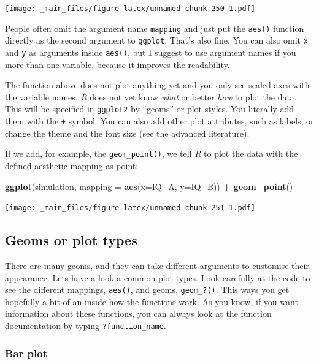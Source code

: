 \documentclass[
]{scrartcl}
\newenvironment{Shaded}{\begin{snugshade}}{\end{snugshade}}
\newcommand{\AttributeTok}[1]{\textcolor[rgb]{0.13,0.29,0.53}{#1}}
\newcommand{\FunctionTok}[1]{\textcolor[rgb]{0.13,0.29,0.53}{\textbf{#1}}}
\newcommand{\NormalTok}[1]{#1}
\newcommand{\SpecialCharTok}[1]{\textcolor[rgb]{0.81,0.36,0.00}{\textbf{#1}}}
\begin{document}
\texttt{[image: \_main\_files/figure-latex/unnamed-chunk-250-1.pdf]}

People often omit the argument name \texttt{mapping} and just put the \texttt{aes()} function directly as the second argument to \texttt{ggplot}. That's also fine. You can also omit \texttt{x} and \texttt{y} as arguments inside \texttt{aes()}, but I suggest to use argument names if you more than one variable, because it improves the readability.

The function above does not plot anything yet and you only see scaled axes with the variable names. \emph{R} does not yet know \emph{what} or better \emph{how} to plot the data. This will be specified in \texttt{ggplot2} by ``geoms'' or plot styles. You literally add them with the \texttt{+} symbol. You can also add other plot attributes, such as labels, or change the theme and the font size (see the advanced literature).

If we add, for example, the \texttt{geom\_point()}, we tell \emph{R} to plot the data with the defined aesthetic mapping as point:

\begin{Shaded}
\begin{Highlighting}[]
\FunctionTok{ggplot}\NormalTok{(simulation, }\AttributeTok{mapping =} \FunctionTok{aes}\NormalTok{(}\AttributeTok{x=}\NormalTok{IQ\_A, }\AttributeTok{y=}\NormalTok{IQ\_B)) }\SpecialCharTok{+} \FunctionTok{geom\_point}\NormalTok{()}
\end{Highlighting}
\end{Shaded}

\texttt{[image: \_main\_files/figure-latex/unnamed-chunk-251-1.pdf]}

\hypertarget{geoms-or-plot-types}{%
\subsection{Geoms or plot types}\label{geoms-or-plot-types}}

There are many geoms, and they can take different arguments to customise their appearance. Lets have a look a common plot types. Look carefully at the code to see the different mappings, \texttt{aes()}, and geoms, \texttt{geom\_?()}. This ways you get hopefully a bit of an inside how the functions work. As you know, if you want information about these functions, you can always look at the function documentation by typing \texttt{?function\_name}.

\hypertarget{bar-plot}{%
\subsubsection{Bar plot}\label{bar-plot}}
\end{document}
